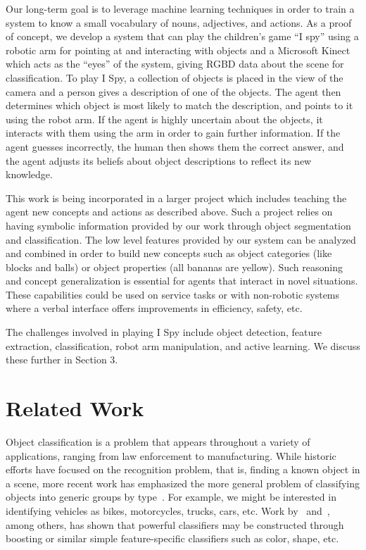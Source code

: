 \documentclass[11pt]{article}
\newcommand{\xxx}[1]{{\bf \color{red} #1}}
\begin{document}
Our long-term goal is to leverage machine learning techniques in order to train
a system to know a small vocabulary of nouns, adjectives, and actions. As a proof
of concept, we develop a system that can play the children's game ``I spy'' using
a robotic arm for pointing at and interacting with objects and a Microsoft Kinect
which acts as the ``eyes'' of the system, giving RGBD data about the scene for
classification. To play I Spy, a collection of objects is placed in the view
of the camera and a person gives a description of one of the objects. The agent
then determines which object is most likely to match the description, and points
to it using the robot arm. If the agent is highly uncertain about the objects, it
interacts with them using the arm in order to gain further information. If the
agent guesses incorrectly, the human then shows them the correct answer, and
the agent adjusts its beliefs about object descriptions to reflect its new
knowledge.

This work is being incorporated in a larger project which includes teaching the
agent new concepts and actions as described above. Such a project relies on having
symbolic information provided by our work through object segmentation and
classification. The low level features provided by our system can be analyzed and
combined in order to build new concepts such as object categories (like blocks
and balls) or object properties (all bananas are yellow). Such reasoning and
concept generalization is essential for agents that interact in novel situations.
These capabilities could be used on service tasks or with non-robotic systems
where a verbal interface offers improvements in efficiency, safety, etc.

The challenges involved in playing I Spy include object detection, feature
extraction, classification, robot arm manipulation, and active learning. We
discuss these further in Section 3.

\section{Related Work}

Object classification is a problem that appears throughout a variety of
applications, ranging from law enforcement to manufacturing. While historic
efforts have focused on the recognition problem, that is, finding a known object
in a scene, more recent work has emphasized the more general problem of
classifying objects into generic groups by type~\cite{huber2004parts}. For example,
we might be interested in identifying vehicles as bikes, motorcycles, trucks,
cars, etc. Work by~\cite{nilsback2006visual} and~\cite{gehler2009feature}, among
others, has shown that powerful classifiers may be constructed through boosting
or similar simple feature-specific classifiers such as color, shape, etc.
\end{document}

